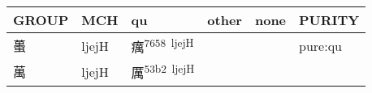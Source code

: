 \documentclass[14pt,a4paper]{scrartcl}
\begin{document}
\begin{longtable}[c]{@{}llllll@{}}
\toprule
\begin{minipage}[b]{0.14\columnwidth}\raggedright\strut
GROUP
\strut\end{minipage} &
\begin{minipage}[b]{0.14\columnwidth}\raggedright\strut
MCH
\strut\end{minipage} &
\begin{minipage}[b]{0.14\columnwidth}\raggedright\strut
qu
\strut\end{minipage} &
\begin{minipage}[b]{0.14\columnwidth}\raggedright\strut
other
\strut\end{minipage} &
\begin{minipage}[b]{0.14\columnwidth}\raggedright\strut
none
\strut\end{minipage} &
\begin{minipage}[b]{0.14\columnwidth}\raggedright\strut
PURITY
\strut\end{minipage}\tabularnewline
\midrule
\endhead
\begin{minipage}[t]{0.14\columnwidth}\raggedright\strut
蠆
\strut\end{minipage} &
\begin{minipage}[t]{0.14\columnwidth}\raggedright\strut
ljejH
\strut\end{minipage} &
\begin{minipage}[t]{0.14\columnwidth}\raggedright\strut
癘\textsuperscript{7658~ljejH}
\strut\end{minipage} &
\begin{minipage}[t]{0.14\columnwidth}\raggedright\strut
\strut\end{minipage} &
\begin{minipage}[t]{0.14\columnwidth}\raggedright\strut
\strut\end{minipage} &
\begin{minipage}[t]{0.14\columnwidth}\raggedright\strut
pure:qu
\strut\end{minipage}\tabularnewline
\begin{minipage}[t]{0.14\columnwidth}\raggedright\strut
萬
\strut\end{minipage} &
\begin{minipage}[t]{0.14\columnwidth}\raggedright\strut
ljejH
\strut\end{minipage} &
\begin{minipage}[t]{0.14\columnwidth}\raggedright\strut
厲\textsuperscript{53b2~ljejH}
\strut\end{minipage} &

\end{longtable}
\end{document}
